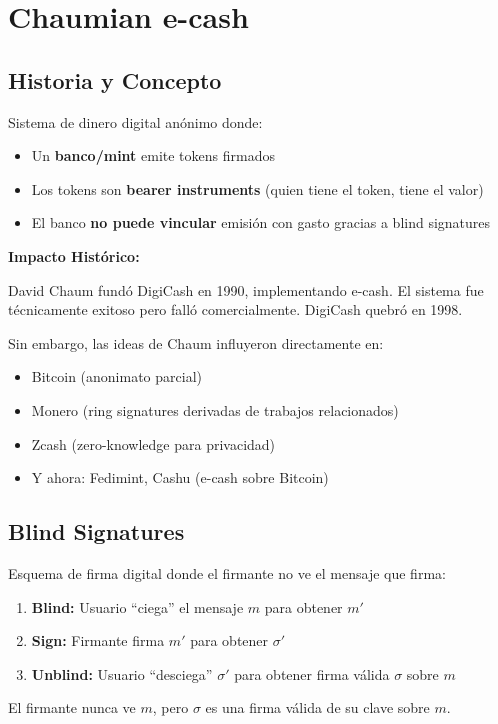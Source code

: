 \documentclass[11pt,a4paper,twoside]{book}
\begin{document}
\section{Chaumian e-cash}
\label{sec:ecash}

\subsection{Historia y Concepto}

\begin{definition}
Sistema de dinero digital an\'onimo donde:
\begin{itemize}
    \item Un \textbf{banco/mint} emite tokens firmados
    \item Los tokens son \textbf{bearer instruments} (quien tiene el token, tiene el valor)
    \item El banco \textbf{no puede vincular} emisi\'on con gasto gracias a blind signatures
\end{itemize}
\end{definition}

\begin{mathnote}
\textbf{Impacto Hist\'orico:}

David Chaum fund\'o DigiCash en 1990, implementando e-cash. El sistema fue t\'ecnicamente exitoso pero fall\'o comercialmente. DigiCash quebr\'o en 1998.

Sin embargo, las ideas de Chaum influyeron directamente en:
\begin{itemize}
    \item Bitcoin (anonimato parcial)
    \item Monero (ring signatures derivadas de trabajos relacionados)
    \item Zcash (zero-knowledge para privacidad)
    \item Y ahora: Fedimint, Cashu (e-cash sobre Bitcoin)
\end{itemize}
\end{mathnote}

\subsection{Blind Signatures}

\begin{definition}
Esquema de firma digital donde el firmante no ve el mensaje que firma:
\begin{enumerate}
    \item \textbf{Blind:} Usuario ``ciega'' el mensaje $m$ para obtener $m'$
    \item \textbf{Sign:} Firmante firma $m'$ para obtener $\sigma'$
    \item \textbf{Unblind:} Usuario ``desciega'' $\sigma'$ para obtener firma v\'alida $\sigma$ sobre $m$
\end{enumerate}

El firmante nunca ve $m$, pero $\sigma$ es una firma v\'alida de su clave sobre $m$.
\end{definition}
\end{document}
